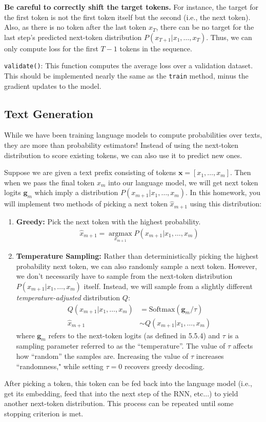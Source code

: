 \documentclass[11pt,addpoints,answers]{exam}
\newcommand{\gv}{\mathbf{g}}
\newcommand{\xv}{\mathbf{x}}
\newcommand \argmax {\operatorname*{argmax}}
\begin{document}
\textbf{Be careful to correctly shift the target tokens.} For instance, the target for the first token is not the first token itself but the second (i.e., the next token). Also, as there is no token after the last token $x_T$, there can be no target for the last step's predicted next-token distribution $P(x_{T+1} | x_1, \ldots, x_T)$. Thus, we can only compute loss for the first $T-1$ tokens in the sequence.

\texttt{validate()}: This function computes the average loss over a validation dataset. This should be implemented nearly the same as the \texttt{train} method, minus the gradient updates to the model.

\subsection{Text Generation}
While we have been training language models to compute probabilities over texts, they are more than probability estimators! Instead of using the next-token distribution to score existing tokens, we can also use it to predict new ones.

Suppose we are given a text prefix consisting of tokens $\xv = [x_1, \ldots, x_m]$. Then when we pass the final token $x_m$ into our language model, we will get next token logits $\gv_m$ which imply a distribution $P(x_{m+1} | x_1, \ldots, x_m)$. In this homework, you will implement two methods of picking a next token $\hat{x}_{m+1}$ using this distribution:

\begin{enumerate}
    \item \textbf{Greedy:} Pick the next token with the highest probability.
    \begin{align*}
        \hat{x}_{m+1} = \argmax_{x_{m+1}} P(x_{m+1} | x_1, \ldots, x_m)
    \end{align*}
    \item \textbf{Temperature Sampling:} Rather than deterministically picking the highest probability next token, we can also randomly sample a next token. However, we don't necessarily have to sample from the next-token distribution $P(x_{m+1} | x_1, \ldots, x_m)$ itself. Instead, we will sample from a slightly different \emph{temperature-adjusted} distribution $Q$:
    \begin{align*}
        Q(x_{m+1} | x_1, \ldots, x_m) &= \text{Softmax}(\gv_m / \tau) \\
        \hat{x}_{m+1} &\sim Q(x_{m+1} | x_1, \ldots, x_m)
    \end{align*}
    where $\gv_m$ refers to the next-token logits (as defined in 5.5.4) and $\tau$ is a sampling parameter referred to as the ``temperature''. The value of $\tau$ affects how ``random'' the samples are. Increasing the value of $\tau$ increases ``randomness," while setting $\tau = 0$ recovers greedy decoding.
\end{enumerate}
After picking a token, this token can be fed back into the language model (i.e., get its embedding, feed that into the next step of the RNN, etc...) to yield another next-token distribution. This process can be repeated until some stopping criterion is met.
\end{document}
